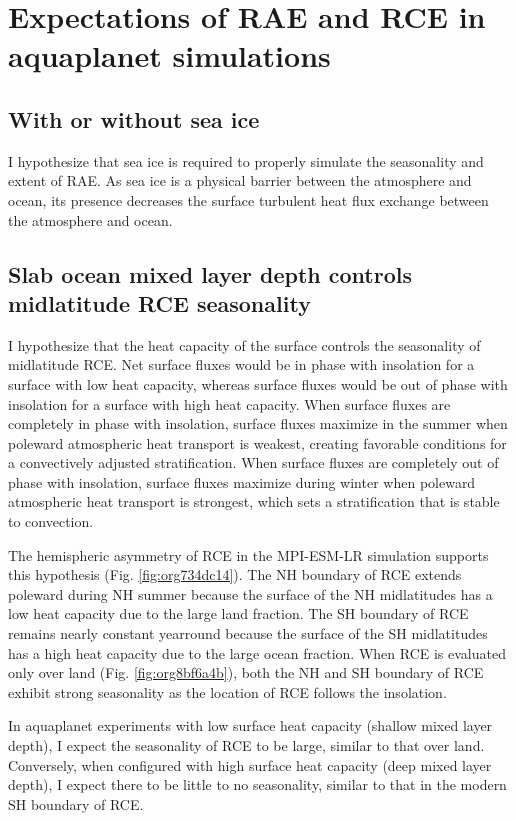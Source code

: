 \documentclass[11pt]{article}
\begin{document}
\section{Expectations of RAE and RCE in aquaplanet simulations}
\label{sec:orgad99e4c}
\subsection{With or without sea ice}
\label{sec:org1d395c5}
I hypothesize that sea ice is required to properly simulate the seasonality and extent of RAE. As sea ice is a physical barrier between the atmosphere and ocean, its presence decreases the surface turbulent heat flux exchange between the atmosphere and ocean.

\subsection{Slab ocean mixed layer depth controls midlatitude RCE seasonality}
\label{sec:org50c378b}
I hypothesize that the heat capacity of the surface controls the seasonality of midlatitude RCE. Net surface fluxes would be in phase with insolation for a surface with low heat capacity, whereas surface fluxes would be out of phase with insolation for a surface with high heat capacity. When surface fluxes are completely in phase with insolation, surface fluxes maximize in the summer when poleward atmospheric heat transport is weakest, creating favorable conditions for a convectively adjusted stratification. When surface fluxes are completely out of phase with insolation, surface fluxes maximize during winter when poleward atmospheric heat transport is strongest, which sets a stratification that is stable to convection.

The hemispheric asymmetry of RCE in the MPI-ESM-LR simulation supports this hypothesis (Fig. \ref{fig:org734dc14}). The NH boundary of RCE extends poleward during NH summer because the surface of the NH midlatitudes has a low heat capacity due to the large land fraction. The SH boundary of RCE remains nearly constant yearround because the surface of the SH midlatitudes has a high heat capacity due to the large ocean fraction. When RCE is evaluated only over land (Fig. \ref{fig:org8bf6a4b}), both the NH and SH boundary of RCE exhibit strong seasonality as the location of RCE follows the insolation.

In aquaplanet experiments with low surface heat capacity (shallow mixed layer depth), I expect the seasonality of RCE to be large, similar to that over land. Conversely, when configured with high surface heat capacity (deep mixed layer depth), I expect there to be little to no seasonality, similar to that in the modern SH boundary of RCE.
\end{document}
